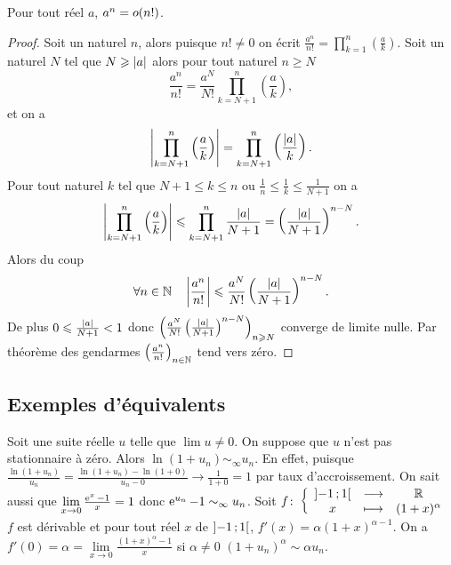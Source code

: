 \begin{prop}
  Pour tout réel $a$, $a^n=o\mathopen{}\left(n!\right)$.
\end{prop}
\begin{proof}
  Soit un naturel $n$, alors puisque $n! \neq 0$ on écrit $\frac{a^n}{n!}=\prod_{k=1}^n \left(\frac{a}{k}\right)$. Soit un naturel $N$ tel que $N \geqslant \left\lvert a\right\rvert$ alors pour tout naturel $n \geqslant N$
  \begin{equation}
    \frac{a^n}{n!} = \frac{a^N}{N!} \prod_{k=N+1}^n \left(\frac{a}{k}\right),
  \end{equation}
  et on a
  \begin{equation}
    \left\lvert\prod_{k=N+1}^n \left(\frac{a}{k}\right)\right\rvert = \prod_{k=N+1}^n \left(\frac{\left\lvert a\right\rvert}{k}\right).
  \end{equation}
  Pour tout naturel $k$ tel que $N+1 \leqslant k \leqslant n$ ou $\frac{1}{n} \leqslant \frac{1}{k} \leqslant \frac{1}{N+1}$ on a
  \begin{equation}
    \left\lvert\prod_{k=N+1}^n \left(\frac{a}{k}\right)\right\rvert \leqslant \prod_{k=N+1}^n \frac{\left\lvert a\right\rvert}{N+1} = \left(\frac{\left\lvert a\right\rvert}{N+1}\right)^{n-N}.
  \end{equation}
  Alors du coup
  \begin{equation}
    \forall n \in \mathbb{N} \quad \left\lvert\frac{a^n}{n!}\right\rvert \leqslant \frac{a^N}{N!} \left(\frac{\left\lvert a\right\rvert}{N+1}\right)^{n-N}.
  \end{equation}
  De plus $0 \leqslant \frac{\left\lvert a\right\rvert}{N+1} < 1$ donc $\left(\frac{a^N}{N!} \left(\frac{\left\lvert a\right\rvert}{N+1}\right)^{n-N}\right)_{n \geqslant N}$ converge de limite nulle. Par théorème des gendarmes $\left(\frac{a^n}{n!}\right)_{n\in \mathbb{N}}$ tend vers zéro.
\end{proof}

\subsection{Exemples d'équivalents}

Soit une suite réelle $u$ telle que $\lim u \neq 0$. On suppose que $u$ n'est pas stationnaire à zéro. Alors $\ln(1+u_n) \sim_\infty u_n$. En effet, puisque $\frac{\ln(1+u_n)}{u_n}= \frac{\ln(1+u_n) - \ln(1+0)}{u_n-0} \to \frac{1}{1+0} =1$ par taux d'accroissement. On sait aussi que $\lim\limits_{x \to 0} \frac{\operatorname{e}^{x}-1}{x}=1$ donc $\operatorname{e}^{u_n}-1 \sim_\infty u_n$. Soit $f\colon \left\{\begin{array}{ccc} \left] -1 \, ;  1 \right[ & \longrightarrow &\mathbb{R}\\ x & \longmapsto & (1+x)^\alpha \end{array} \right.$ $f$ est dérivable et pour tout réel $x$ de $\left] -1 \, ;  1 \right[$, $f'(x)=\alpha(1+x)^{\alpha -1}$. On a $f'(0)=\alpha = \lim\limits_{x \to 0}\frac{(1+x)^\alpha-1}{x}$ si $\alpha \neq 0$ $(1+u_n)^\alpha \sim \alpha u_n$.

